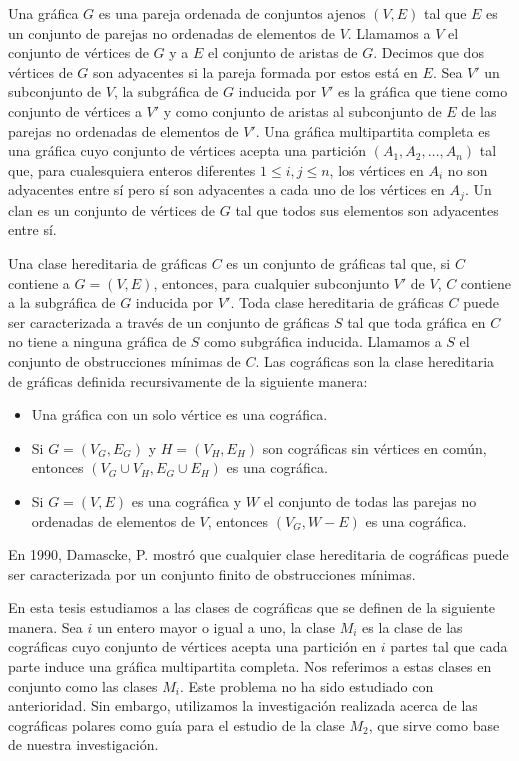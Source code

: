 Una gráfica $G$ es una pareja ordenada de conjuntos ajenos $(V,E)$ tal que $E$ es un conjunto de parejas no ordenadas de elementos de $V$. Llamamos a $V$ el conjunto de vértices de $G$ y a $E$ el conjunto de aristas de $G$. Decimos que dos vértices de $G$ son adyacentes si la pareja formada por estos está en $E$. Sea $V'$ un subconjunto de $V$, la subgráfica de $G$ inducida por $V'$ es la gráfica que tiene como conjunto de vértices a $V'$ y como conjunto de aristas al subconjunto de $E$ de las parejas no ordenadas de elementos de $V'$. Una gráfica multipartita completa es una gráfica cuyo conjunto de vértices acepta una partición $(A_1, A_2,\dots, A_n)$ tal que, para cualesquiera enteros diferentes $1\le i,j \le n$, los vértices en $A_i$ no son adyacentes entre sí pero sí son adyacentes a cada uno de los vértices en $A_j$. Un clan es un conjunto de vértices de $G$ tal que todos sus elementos son adyacentes entre sí. 

Una clase hereditaria de gráficas $C$ es un conjunto de gráficas tal que, si $C$ contiene a $G=(V,E)$, entonces, para cualquier subconjunto $V'$ de $V$, $C$ contiene a la subgráfica de $G$ inducida por $V'$. Toda clase hereditaria de gráficas $C$ puede ser caracterizada a través de un conjunto de gráficas $S$ tal que toda gráfica en $C$ no tiene a ninguna gráfica de $S$ como subgráfica inducida. Llamamos a $S$ el conjunto de obstrucciones mínimas de $C$. Las cográficas son la clase hereditaria de gráficas definida recursivamente de la siguiente manera:

\begin{itemize}
    \item Una gráfica con un solo vértice es una cográfica. 
    \item Si $G=(V_G,E_G)$ y $H=(V_H,E_H)$ son cográficas sin vértices en común, entonces $(V_G\cup V_H, E_G \cup E_H)$ es una cográfica.
    \item Si $G=(V,E)$ es una cográfica y $W$ el conjunto de todas las parejas no ordenadas de elementos de $V$, entonces $(V_G, W-E)$ es una cográfica.
\end{itemize}

En 1990, Damascke, P. \cite{Damaschke} mostró que cualquier clase hereditaria de cográficas puede ser caracterizada por un conjunto finito de obstrucciones mínimas.

En esta tesis estudiamos a las clases de cográficas que se definen de la siguiente manera. Sea $i$ un entero mayor o igual a uno, la clase $M_i$ es la clase de las cográficas cuyo conjunto de vértices acepta una partición en $i$ partes tal que cada parte induce una gráfica multipartita completa. Nos referimos a estas clases en conjunto como las clases $M_i$. Este problema no ha sido estudiado con anterioridad. Sin embargo, utilizamos la investigación realizada acerca de las cográficas polares como guía para el estudio de la clase $M_2$, que sirve como base de nuestra investigación.

